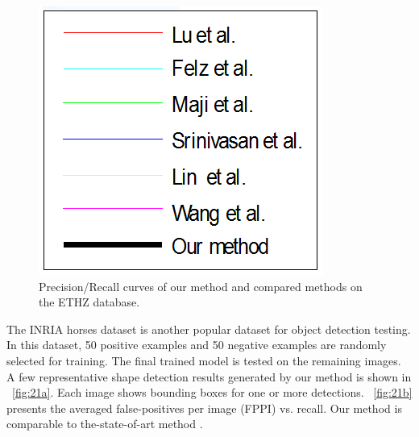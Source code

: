 \documentclass[journal]{IEEEtran}
\begin{document}
\begin{figure}[!t]
\includegraphics[width=0.4\linewidth]{images/fig17f.png}
\caption{Precision/Recall curves of our method and compared methods on the ETHZ database.}
\label{fig:17}
\end{figure}

The INRIA horses dataset is another popular dataset for object detection testing. 
In this dataset, 50 positive examples and 50 negative examples are randomly selected for training. 
The final trained model is tested on the remaining images.
A few representative shape detection results generated by our method is shown in \figurename~\ref{fig:21a}. 
Each image shows bounding boxes for one or more detections. 
\figurename~\ref{fig:21b} presents the averaged false-positives per image (FPPI) vs. recall.
Our method is comparable to the-state-of-art method \cite{luo2010,jurie2004,ferrari2007,yarlagadda2010,lin2012}.
\end{document}
